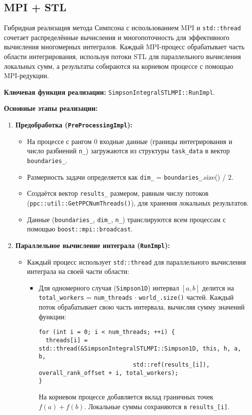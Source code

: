 \documentclass[12pt]{article}
\begin{document}
\subsection{MPI + STL}

Гибридная реализация метода Симпсона с использованием MPI и \texttt{std::thread} сочетает распределённые вычисления и многопоточность для эффективного вычисления многомерных интегралов. Каждый MPI-процесс обрабатывает часть области интегрирования, используя потоки STL для параллельного вычисления локальных сумм, а результаты собираются на корневом процессе с помощью MPI-редукции.

\textbf{Ключевая функция реализации:} \texttt{SimpsonIntegralSTLMPI::RunImpl}.

\textbf{Основные этапы реализации:}
\begin{enumerate}
  \item \textbf{Предобработка (\texttt{PreProcessingImpl}):}
  \begin{itemize}
    \item На процессе с рангом 0 входные данные (границы интегрирования и число разбиений \texttt{n\_}) загружаются из структуры \texttt{task\_data} в вектор \texttt{boundaries\_}.
    \item Размерность задачи определяется как \texttt{dim\_} = \texttt{boundaries\_}.size() / 2.
    \item Создаётся вектор \texttt{results\_} размером, равным числу потоков (\texttt{ppc::util::GetPPCNumThreads()}), для хранения локальных результатов.
    \item Данные (\texttt{boundaries\_}, \texttt{dim\_}, \texttt{n\_}) транслируются всем процессам с помощью \texttt{boost::mpi::broadcast}.
  \end{itemize}

  \item \textbf{Параллельное вычисление интеграла (\texttt{RunImpl}):}
  \begin{itemize}
    \item Каждый процесс использует \texttt{std::thread} для параллельного вычисления интеграла на своей части области:
    \begin{itemize}
      \item Для одномерного случая (\texttt{Simpson1D}) интервал $[a, b]$ делится на \texttt{total\_workers} = \texttt{num\_threads} $\cdot$ \texttt{world\_.size()} частей. Каждый поток обрабатывает свою часть интервала, вычисляя сумму значений функции:
      \begin{lstlisting}
for (int i = 0; i < num_threads; ++i) {
  threads[i] = std::thread(&SimpsonIntegralSTLMPI::Simpson1D, this, h, a, b, 
                           std::ref(results_[i]), overall_rank_offset + i, total_workers);
}
      \end{lstlisting}
      На корневом процессе добавляется вклад граничных точек $f(a) + f(b)$. Локальные суммы сохраняются в \texttt{results\_[i]}.


\end{itemize}
\end{itemize}
\end{enumerate}
\end{document}
